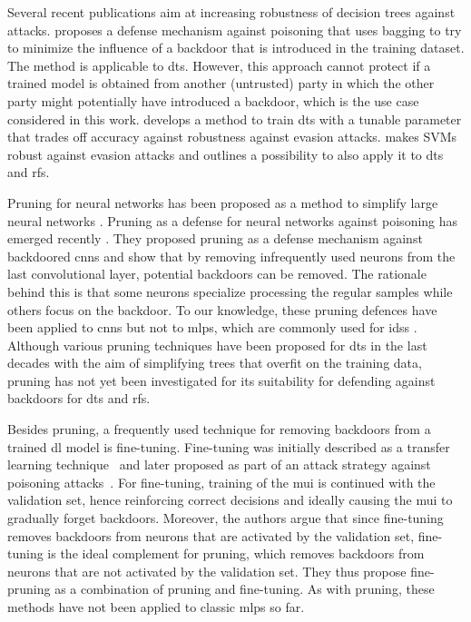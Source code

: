 \documentclass[9pt,sigconf,letterpaper,dvipsnames\ifx\removeHeaders\tempYes ,nonacm\fi]{acmart}
\newcommand\note[2]{{\color{#1}#2}}
\newcommand\todo[1]{{\note{red}{TODO: #1}}}
\begin{document}
Several recent publications aim at
increasing robustness of decision trees against attacks. \cite{biggio_bagging_2011} proposes a defense mechanism against poisoning that uses bagging to try to minimize the influence of a backdoor that is introduced in the training dataset. The method is applicable to \glspl{dt}. However, this approach cannot protect if a trained model is obtained from another (untrusted) party in which the other party might potentially have introduced a backdoor, which is the use case considered in this work. \cite{chen_robust_2019} develops a method to train \glspl{dt} with a tunable parameter that trades off accuracy against robustness against evasion attacks. \cite{russu_secure_2016} makes SVMs robust against evasion attacks and outlines a possibility to also apply it to \glspl{dt} and \glspl{rf}.

Pruning for neural networks has been proposed
as a method to simplify large neural networks \cite{sietsma_neural_1988}.
Pruning as a defense for neural networks against poisoning has emerged recently \cite{gu_badnets:_2017}. They proposed pruning as a defense mechanism against backdoored \glspl{cnn} and show that by removing infrequently used neurons from the last convolutional layer, potential backdoors can be removed. The rationale behind this is that some neurons specialize processing the regular samples while others focus on the backdoor.
To our knowledge, these pruning defences have been applied to \glspl{cnn} but not to \glspl{mlp}, which are commonly used for \glspl{ids} \cite{meghdouri_analysis_2018}. Although various pruning techniques have been proposed for \glspl{dt} in the last decades \cite{esposito_comparative_1997} with the aim of simplifying trees that overfit on the training data, pruning has not yet been investigated for its suitability for defending against backdoors for \glspl{dt} and \glspl{rf}.

Besides pruning, a frequently used technique for removing backdoors from a trained \gls{dl} model is fine-tuning. Fine-tuning was initially described as a transfer learning technique~\cite{yosinski_how_2014} and later proposed as part of an attack strategy against poisoning attacks~\cite{liu_fine-pruning:_2018}. For fine-tuning, training of the \gls{mui} is continued with the validation set, hence reinforcing correct decisions and ideally causing the \gls{mui} to gradually forget backdoors. Moreover, the authors argue that since fine-tuning removes backdoors from neurons that are activated by the validation set, fine-tuning is the ideal complement for pruning, which removes backdoors from neurons that are not activated by the validation set. They thus propose fine-pruning as a combination of pruning and fine-tuning. As with pruning, these methods have not been applied to classic \glspl{mlp} so far.
\end{document}
